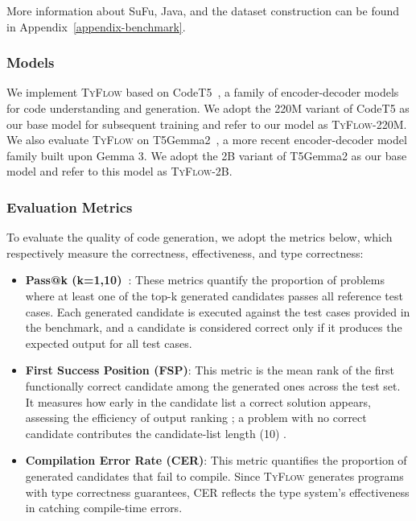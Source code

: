 \documentclass[manuscript,screen]{acmart}
\newcommand{\toolname}[1]{\textsc{#1}}
\newcommand{\mainname}{\toolname{TyFlow}\xspace}
\begin{document}
More information about SuFu, Java, and the    {\color{revblue}dataset construction } can be found in Appendix~\ref{appendix-benchmark}.

\subsubsection{Models}
We implement \mainname based on CodeT5~\cite{DBLP:conf/emnlp/0034WJH21}, a family of encoder-decoder models for code understanding and generation. We adopt the 220M variant of CodeT5 as our base model for subsequent training and refer to our model as \mainname-220M. 
We also evaluate \mainname on T5Gemma2~\cite{zhang2025t5gemma2seeingreading}, a more recent encoder-decoder model family built upon Gemma 3. We adopt the 2B variant of T5Gemma2 as our base model and refer to this model as \mainname-2B. 

\subsubsection{Evaluation Metrics} 
\label{sec:evaluation-metrics}
To evaluate the quality of code generation, we adopt the metrics below, which respectively measure the correctness, effectiveness, and type correctness:

\begin{itemize}
    \item \textbf{Pass@k (k=1,10)~\cite{DBLP:journals/corr/abs-2107-03374}}: These metrics quantify the proportion of problems where at least one of the top-k generated candidates passes all reference test cases. Each generated candidate is executed against the test cases provided in the benchmark, and a candidate is considered correct only if it produces the expected output for all test cases. 

    \item \textbf{First Success Position (FSP)}: This metric is the mean rank of the first functionally correct candidate among the generated ones across the test set. It measures how early in the candidate list a correct solution appears, assessing the efficiency of output ranking {\color{revblue}; a problem with no correct candidate contributes the candidate-list length (10)} .

    \item \textbf{Compilation Error Rate (CER)}: This metric quantifies the proportion of generated candidates that fail to compile. 
    Since \mainname generates programs with type correctness guarantees, CER reflects the type system's effectiveness in catching compile-time errors. 
\end{itemize}
\end{document}
